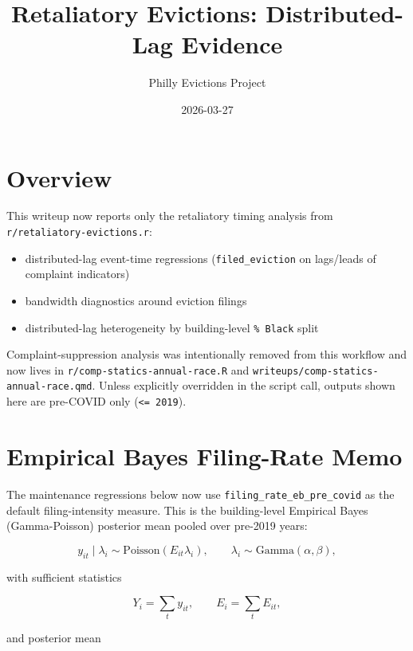 \documentclass[
  11pt,
]{article}
\title{Retaliatory Evictions: Distributed-Lag Evidence}
\author{Philly Evictions Project}
\date{2026-03-27}
\providecommand{\tightlist}{%
  \setlength{\itemsep}{0pt}\setlength{\parskip}{0pt}}
\renewcommand*\contentsname{Table of contents}
\newcommand\contentsname{Table of contents}
\begin{document}
\maketitle

\renewcommand*\contentsname{Table of contents}
{
\hypersetup{linkcolor=}
\setcounter{tocdepth}{3}
\tableofcontents
}

\newpage

\section{Overview}\label{overview}

This writeup now reports only the retaliatory timing analysis from
\texttt{r/retaliatory-evictions.r}:

\begin{itemize}
\tightlist
\item
  distributed-lag event-time regressions (\texttt{filed\_eviction} on
  lags/leads of complaint indicators)
\item
  bandwidth diagnostics around eviction filings
\item
  distributed-lag heterogeneity by building-level \texttt{\%\ Black}
  split
\end{itemize}

Complaint-suppression analysis was intentionally removed from this
workflow and now lives in \texttt{r/comp-statics-annual-race.R} and
\texttt{writeups/comp-statics-annual-race.qmd}. Unless explicitly
overridden in the script call, outputs shown here are pre-COVID only
(\texttt{\textless{}=\ 2019}).

\newpage

\section{Empirical Bayes Filing-Rate
Memo}\label{empirical-bayes-filing-rate-memo}

The maintenance regressions below now use
\texttt{filing\_rate\_eb\_pre\_covid} as the default filing-intensity
measure. This is the building-level Empirical Bayes (Gamma-Poisson)
posterior mean pooled over pre-2019 years:

\[
y_{it} \mid \lambda_i \sim \text{Poisson}(E_{it}\lambda_i), \qquad
\lambda_i \sim \text{Gamma}(\alpha,\beta),
\]

with sufficient statistics

\[
Y_i=\sum_t y_{it}, \qquad E_i=\sum_t E_{it},
\]

and posterior mean
\end{document}
